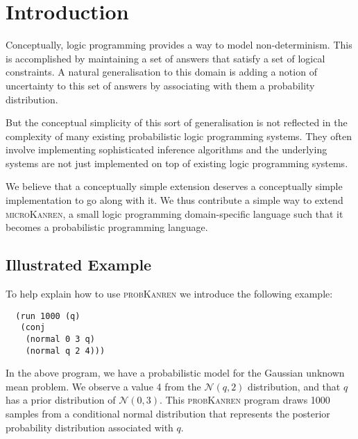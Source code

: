 \documentclass[
]{ceurart}
\begin{document}
\maketitle

\section{Introduction}

Conceptually, logic programming provides a way to model
non-determinism. This is accomplished by maintaining a set of answers
that satisfy a set of logical constraints. A natural generalisation
to this domain is adding a notion of uncertainty to this set of answers
by associating with them a probability distribution.

But the conceptual simplicity of this sort of generalisation is not
reflected in the complexity of many existing probabilistic logic
programming systems.  They often involve implementing sophisticated
inference algorithms and the underlying systems are not just
implemented on top of existing logic programming systems.

We believe that a conceptually simple extension deserves a
conceptually simple implementation to go along with it. We thus
contribute a simple way to extend \textsc{microKanren}, a small logic
programming domain-specific language such that it becomes a
probabilistic programming language.

\subsection{Illustrated Example}

To help explain how to use \textsc{probKanren} we introduce the following example:


\begin{verbatim}
  (run 1000 (q)
   (conj
    (normal 0 3 q)
    (normal q 2 4)))
\end{verbatim}


In the above program, we have a probabilistic model for the Gaussian
unknown mean problem. We observe a value 4 from the $\mathcal{N}(q,2)$
distribution, and that $q$ has a prior distribution of $\mathcal{N}(0, 3)$.
This \textsc{probKanren} program draws 1000 samples from a conditional normal distribution
that represents the posterior probability distribution associated with $q$.
\end{document}
